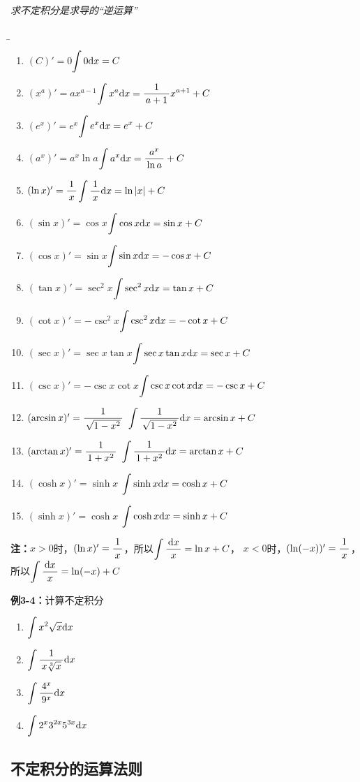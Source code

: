{\it 求不定积分是求导的“逆运算”}{\b
\begin{enumerate} [(1)]
  \setlength{\itemindent}{1cm}
  \item $(C)'=0$\hfill  {$\dint 0\d x=C$} 
  \item $(x^a)'=ax^{a-1}$\hfill  {$\dint x^a\d x=\df{1}{a+1}x^{a+1}+C$}
  \item $(e^x)'=e^x$\hfill  {$\dint e^x\d x=e^x+C$} 
  \item $(a^x)'=a^x\ln a$\hfill  {$\dint a^x\d x=\df{a^x}{\ln a}+C$}
  \item $(\ln x)'=\df 1x$\hfill  {$\dint \df 1x\d x=\ln|x|+C$}
  \item $(\sin x)'=\cos x$\hfill  {$\dint \cos x\d x=\sin x+C$} 
  \item $(\cos x)'=\sin x$\hfill  {$\dint \sin x\d x=-\cos x+C$}
  \item $(\tan x)'=\sec^2 x$\hfill  {$\dint \sec^2 x\d x=\tan x+C$} 
  \item $(\cot x)'=-\csc^2 x$\hfill  {$\dint \csc^2 x\d x=-\cot x+C$}
  \item $(\sec x)'=\sec x\tan x$\hfill $\dint\sec x\tan x\d x=\sec x+C$
  \item $(\csc x)'=-\csc x\cot x$\hfill $\dint\csc x\cot x\d x=-\csc x+C$
  \item $(\arcsin x)'=\df{1}{\sqrt{1-x^2}}$ \hfill  
  {$\dint{\df{1}{\sqrt{1-x^2}}}\d x=\arcsin x+C$} 
  \item $(\arctan x)'=\df{1}{1+x^2}$ \hfill 
  {$\dint \df{1}{1+x^2}\d x=\arctan x+C$}
  \item $(\cosh x)'=\sinh x$ \hfill $\dint\sinh x\d x=\cosh x+C$
  \item $(\sinh x)'=\cosh x$ \hfill $\dint\cosh x\d x=\sinh x+C$
\end{enumerate}}

{\bf 注：}$x>0$时，$(\ln x)'=\df 1x$，所以$\dint\df{\d x}x=\ln x+C$，
$x<0$时，$(\ln(-x))'=\df1x$，所以$\dint\df{\d x}x=\ln(-x)+C$

{\bf 例3-4：}计算不定积分
\begin{enumerate}[(1)]
  \setlength{\itemindent}{1cm}
  \item $\dint x^2\sqrt{x}\d x$ 
  \item $\dint \df{1}{x\sqrt[3]{x}}\d x$ 
  \item $\dint \df{4^x}{9^x}\d x$ 
  \item $\dint 2^x3^{2x}5^{3x}\d x$
\end{enumerate}

\subsection{不定积分的运算法则}

